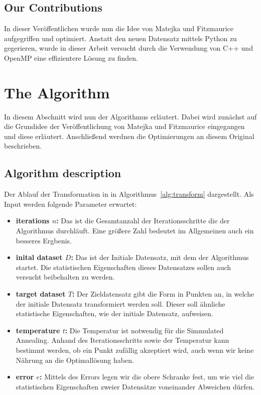 \documentclass[sigconf]{acmart}
\begin{document}
\subsection{Our Contributions}

In dieser Veröffentlichen wurde nun die Idee von Matejka und Fitzmaurice\cite{matejka2017same} aufgegriffen und optimiert. Anstatt den neuen Datensatz mittels Python zu gegerieren, wurde in dieser Arbeit versucht durch die Verwendung von C++ und OpenMP eine effizientere Lösung zu finden.  




\section{The Algorithm}\label{sec:algo}

In diesem Abschnitt wird nun der Algorithmus erläutert. Dabei wird zunächst auf die Grundidee der Veröffentlichung von Matejka und Fitzmaurice\cite{matejka2017same} eingegangen und diese erläutert. Anschließend werdnen die Optimierungen an diesem Original beschrieben.

\subsection{Algorithm description}\label{sec:algo:desc}

Der Ablauf der Transformation in in Algorithmus~\ref{alg:transform} dargestellt. Als Input werden folgende Parameter erwartet:
\begin{itemize}
  \item \textbf{iterations $n$:} Das ist die Gesamtanzahl der Iterationsschritte die der Algorithmus durchläuft. Eine größere Zahl bedeutet im Allgemeinen auch ein besseres Ergbenis.
  \item \textbf{inital dataset $D$:} Das ist der Initiale Datensatz, mit dem der Algorithmus startet. Die statistischen Eigenschaften dieses Datensatzes sollen auch versucht beibehalten zu werden.
  \item \textbf{target dataset $T$:} Der Zieldatensatz gibt die Form in Punkten an, in welche der initiale Datensatz transformiert werden soll. Dieser soll ähnliche statistische Eigenschaften, wie der initiale Datensatz, aufweisen.
  \item \textbf{temperature $t$:} Die Temperatur ist notwendig für die Simmulated Annealing. Anhand des Iterationsschritts sowie der Temperatur kann bestimmt werden, ob ein Punkt zufällig akzeptiert wird, auch wenn wir keine Nährung an die Optimallösung haben.
  \item \textbf{error $e$:} Mittels des Errors legen wir die obere Schranke fest, um wie viel die statistischen Eigenschaften zweier Datensätze voneinander Abweichen dürfen.
\end{itemize}
\end{document}
